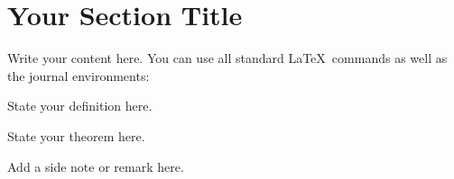 
\section{Your Section Title}

Write your content here.  You can use all standard \LaTeX\ commands
as well as the journal environments:

\begin{definitionbox}
  State your definition here.
\end{definitionbox}

\begin{theorembox}
  State your theorem here.
\end{theorembox}

\begin{notebox}
  Add a side note or remark here.
\end{notebox}
